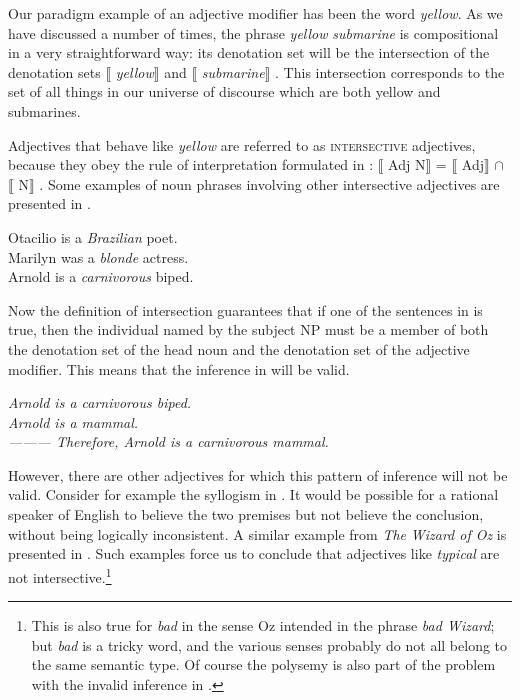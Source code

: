 Our paradigm example of an adjective modifier has been the word \textit{yellow}. As we have discussed a number of times, the phrase \textit{yellow} \textit{submarine} is compositional in a very straightforward way: its denotation set will be the intersection of the denotation sets $\llbracket$ \textit{yellow}$\rrbracket$  and $\llbracket$ \textit{submarine}$\rrbracket$ . This intersection corresponds to the set of all things in our universe of discourse which are both yellow and submarines.



Adjectives that behave like \textit{yellow} are referred to as \textsc{intersective} adjectives, because they obey the rule of interpretation formulated in : $\llbracket$ Adj N$\rrbracket$  = $\llbracket$ Adj$\rrbracket$  ${\cap}$ $\llbracket$ N$\rrbracket$ . Some examples of noun phrases involving other intersective adjectives are presented in .


\ea
\ea Otacilio is a \textit{Brazilian} poet.\\
\ex Marilyn was a \textit{blonde} actress.\\
\ex Arnold is a \textit{carnivorous} biped.
                       \z
\z


Now the definition of intersection guarantees that if one of the sentences in  is true, then the individual named by the subject NP must be a member of both the denotation set of the head noun and the denotation set of the adjective modifier. This means that the inference in  will be valid.


\ea
\textit{Arnold is a carnivorous biped.}\\
\textit{Arnold is a mammal.\\
———\FelixHRule
Therefore, Arnold is a carnivorous mammal.}
\z


However, there are other adjectives for which this pattern of inference will not be valid. Consider for example the syllogism in . It would be possible for a rational speaker of English to believe the two premises but not believe the conclusion, without being logically inconsistent. A similar example from \textit{The} \textit{Wizard of Oz} is presented in . Such examples force us to conclude that adjectives like \textit{typical} are not intersective.\footnote{This is also true for \textit{bad} in the sense Oz intended in the phrase \textit{bad Wizard}; but \textit{bad} is a tricky word, and the various senses probably do not all belong to the same semantic type. Of course the polysemy is also part of the problem with the invalid inference in .}


